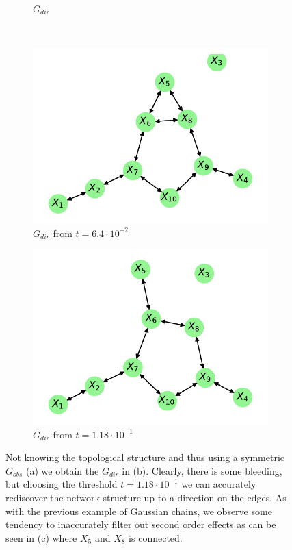 \documentclass[../Thesis.tex]{subfiles}
\begin{document}
\begin{figure}[ht]
\begin{subfigure}[t]{0.49\textwidth}
        \caption{$G_{dir}$}
    \end{subfigure}
    \\[\baselineskip]
    \begin{subfigure}[t]{0.49\textwidth}
        \centering
        \includegraphics[width=.9\linewidth]{figures/Gaussian Network Theoretical/Graph from symmetric G obs - cor - cutoff 6_4e-2.pdf}
        \caption{$G_{dir}$  from $t = 6.4 \cdot 10^{-2}$}
    \end{subfigure}
    \hfill
    \begin{subfigure}[t]{0.49\textwidth}
        \centering
        \includegraphics[width=.9\linewidth]{figures/Gaussian Network Theoretical/Graph from symmetric G obs - cor - cutoff 1_18e-1.pdf}
        \caption{$G_{dir}$ from $t = 1.18 \cdot 10^{-1}$}
    \end{subfigure}
    \caption{Not knowing the topological structure and thus using a symmetric $G_{obs}$ (a) we obtain the $G_{dir}$ in (b). Clearly, there is some bleeding, but choosing the threshold $t = 1.18 \cdot 10^{-1}$ we can accurately rediscover the network structure up to a direction on the edges. As with the previous example of Gaussian chains, we observe some tendency to inaccurately filter out second order effects as can be seen in (c) where $X_5$ and $X_8$ is connected.}
    \label{fig:Gaussian network symmetric G_obs using correlation}
\end{figure}
\end{document}
